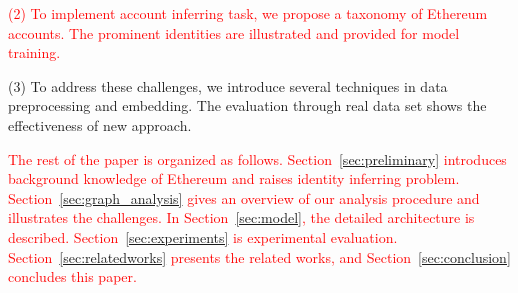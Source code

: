 \textcolor{red}{(2) To implement account inferring task, we propose a taxonomy of Ethereum accounts. The prominent identities are illustrated and provided for model training.}


(3) To address these challenges, we introduce several techniques in data preprocessing and embedding. The evaluation through real data set shows the effectiveness of new approach.

\textcolor{red}{The rest of the paper is organized as follows. Section~\ref{sec:preliminary} introduces background knowledge of Ethereum and raises identity inferring problem. Section~\ref{sec:graph_analysis} gives an overview of our analysis procedure and illustrates the challenges. In Section~\ref{sec:model}, the detailed architecture is described. Section~\ref{sec:experiments} is experimental evaluation. Section~\ref{sec:relatedworks} presents the related works, and Section~\ref{sec:conclusion} concludes this paper.}



